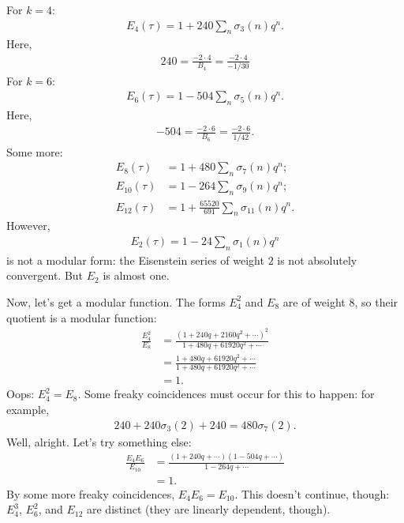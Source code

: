 \documentclass[11pt, oneside,margin=1in]{article}
\begin{document}
\begin{example}[ ]\label{}\text{}
For $k=4$:
	\begin{align*}
	E_4(\tau) = 1 +240 \sum_{n}^{} \sigma_3(n)q^n.
\end{align*}
Here,
\begin{align*}
	240 = \frac{-2 \cdot 4}{B_4} = \frac{-2\cdot 4}{-1/30}
\end{align*}
For $k=6$:
\begin{align*}
	E_6(\tau) = 1 - 504  \sum_{n}^{} \sigma_5(n)q^n.
\end{align*}
Here,
\begin{align*}
	-504 = \frac{-2\cdot 6}{B_6} = \frac{-2\cdot 6}{1/42}.
\end{align*}
Some more:
\begin{align*}
	E_8(\tau) &= 1 + 480 \sum_{n}^{} \sigma_7(n) q^n;\\
	E_{10}(\tau) &= 1 - 264 \sum_{n}^{} \sigma_9(n) q^n;\\
	E_{12}(\tau) &= 1 + \frac{65520}{691}\sum_{n}^{} \sigma_{11}(n) q^n.
\end{align*}
However,
\begin{align*}
	E_2(\tau) = 1 -24  \sum_{n}^{} \sigma_1(n)q^n
\end{align*}
is not a modular form: the Eisenstein series of weight $2$ is not absolutely convergent. But $E_2$ is almost one.

Now, let's get a modular function. The forms $E_4^2$ and $E_8$ are of weight $8$, so their quotient is a modular function:
\begin{align*}
	\frac{E_4^2}{E_8} &= \frac{(1 + 240q + 2160q^2 + \cdots)^2}{1 + 480 q + 61920q^2+ \cdots}\\
			  &= \frac{1 + 480q + 61920q^2 + \cdots}{1 + 480q + 61920q^2 + \cdots}\\
			  &=1.
\end{align*}
Oops: $E_4^2 = E_8$. Some freaky coincidences must occur for this to happen: for example,
\begin{align*}
	240 + 240 \sigma_3(2) + 240 = 480 \sigma_7(2).
\end{align*}
Well, alright. Let's try something else:
\begin{align*}
	\frac{E_{4}E_6}{E_{10}} &= \frac{(1+240q + \cdots) (1 - 504q +  \cdots)}{1 - 264q + \cdots}\\
				&= 1.
\end{align*}
By some more freaky coincidences, $E_4E_6=E_{10}$. This doesn't continue, though: $E_4^3$, $E_6^2$, and $E_{12}$ are distinct (they are linearly dependent, though).


\end{example}
\end{document}
